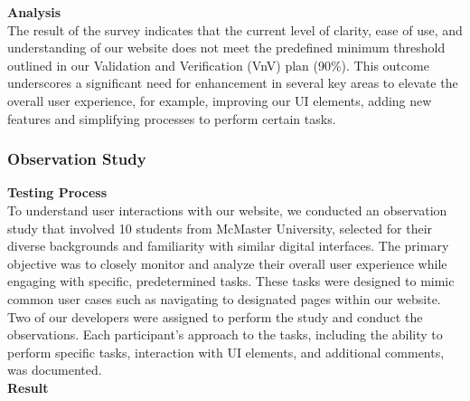 \documentclass[12pt, titlepage]{article}
\begin{document}
\noindent \textbf{Analysis} \\

\noindent The result of the survey indicates that the current level of clarity, ease of use, and understanding of our website does not meet the predefined minimum threshold outlined in our Validation and Verification (VnV) plan (90\%). This outcome underscores a significant need for enhancement in several key areas to elevate the overall user experience, for example, improving our UI elements, adding new features and simplifying processes to perform certain tasks.

\subsubsection{Observation Study}\label{4.1.2}

\textbf{Testing Process} \\

\noindent To understand user interactions with our website, we conducted an observation study that involved 10 students from McMaster University, selected for their diverse backgrounds and familiarity with similar digital interfaces. The primary objective was to closely monitor and analyze their overall user experience while engaging with specific, predetermined tasks. These tasks were designed to mimic common user cases such as navigating to designated pages within our website. Two of our developers were assigned to perform the study and conduct the observations. Each participant's approach to the tasks, including the ability to perform specific tasks, interaction with UI elements, and additional comments, was documented.\\

\noindent \textbf{Result}\\
\end{document}
